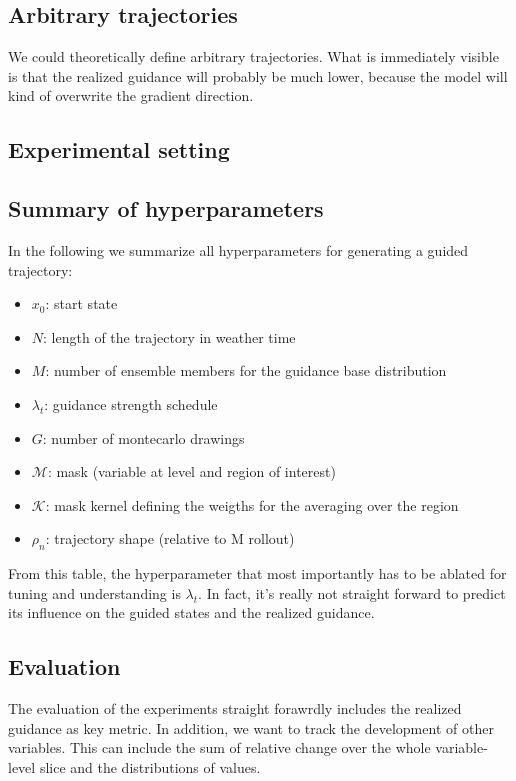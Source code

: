 \documentclass[a4paper,12pt]{article}
\begin{document}
\subsection{Arbitrary trajectories}
We could theoretically define arbitrary trajectories.
What is immediately visible is that the realized guidance will probably be much lower, because the model will kind of overwrite the gradient direction.

\subsection{Experimental setting}
\subsection{Summary of hyperparameters}
In the following we summarize all hyperparameters for generating a guided trajectory:
\begin{itemize}[noitemsep]
    \item $x_0$: start state
    \item $N$: length of the trajectory in weather time
    \item $M$: number of ensemble members for the guidance base distribution
    \item $\lambda_t$: guidance strength schedule
    \item $G$: number of montecarlo drawings
    \item $\mathcal{M}$: mask (variable at level and region of interest) 
    \item $\mathcal{K}$: mask kernel defining the weigths for the averaging over the region
    \item $\rho_n$: trajectory shape (relative to M rollout)
\end{itemize}
From this table, the hyperparameter that most importantly has to be ablated for tuning and understanding is $\lambda_t$. 
In fact, it's really not straight forward to predict its influence on the guided states and the realized guidance.

\subsection{Evaluation}
The evaluation of the experiments straight forawrdly includes the realized guidance as key metric.
In addition, we want to track the development of other variables. This can include the sum of relative change over the whole variable-level slice and the distributions of values.
\end{document}
